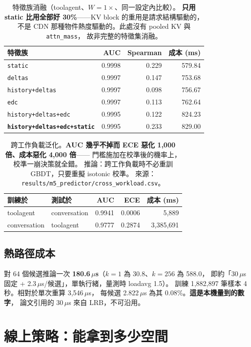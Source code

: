 \documentclass[11pt]{article}
\newcommand{\key}[1]{\textcolor{hlcol}{\textbf{#1}}}
\begin{document}
\begin{table}[htbp]\centering\small
\caption{特徵族消融（toolagent、$W=1\times$、同一設定內比較）。
\key{只用 static 比用全部好 30\%}——KV block 的重用是請求結構驅動的，
不是 CDN 那種物件熱度驅動的。此處沒有 pooled KV 與 \texttt{attn\_mass}，
故非完整的特徵集消融。}
\begin{tabular}{lrrr}
\toprule
特徵族 & AUC & Spearman & 成本 (ms) \\
\midrule
\texttt{static} & 0.9998 & 0.229 & 579.84 \\
\texttt{deltas} & 0.9997 & 0.147 & 753.68 \\
\texttt{history+deltas} & 0.9997 & 0.098 & 756.67 \\
\texttt{edc} & 0.9997 & 0.113 & 762.64 \\
\texttt{history+deltas+edc} & 0.9995 & 0.122 & 824.23 \\
\texttt{\textbf{history+deltas+edc+static}} & 0.9995 & 0.233 & 829.00 \\
\bottomrule
\end{tabular}
\end{table}

\begin{table}[htbp]\centering\small
\caption{跨工作負載泛化。\key{AUC 幾乎不掉而 ECE 惡化 1{,}000 倍、成本惡化 4{,}000 倍}——
門檻施加在校準後的機率上，校準一崩決策就全錯。
推論：跨工作負載時不必重訓 GBDT，只要重擬 isotonic 校準。
來源：\texttt{results/m5\_predictor/cross\_workload.csv}。}
\begin{tabular}{llrrr}
\toprule
訓練於 & 測試於 & AUC & ECE & 成本 (ms) \\
\midrule
toolagent & conversation & 0.9941 & 0.0006 & 5,889 \\
conversation & toolagent & 0.9777 & 0.2874 & 3,385,691 \\
\bottomrule
\end{tabular}
\end{table}

\subsection{熱路徑成本}
對 64 個候選推論一次 \textbf{180.6\,$\mu$s}（$k=1$ 為 30.8、$k=256$ 為 588.0，
即約「30\,$\mu$s 固定 + 2.3\,$\mu$s/候選」，單執行緒，量測時 loadavg 1.5）。
訓練 1{,}882{,}897 筆樣本 4 秒。相對於單次重算 3{,}546\,$\mu$s，
每候選 2.822\,$\mu$s 為其 0.08\%。\textbf{這是本機量到的數字}，
論文引用的 30\,$\mu$s 來自 LRB，不可沿用。

\section{線上策略：能拿到多少空間}
\end{document}
